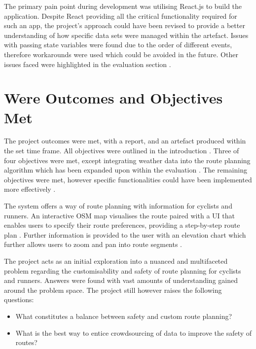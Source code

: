 The primary pain point during development was utilising React.js to build the application. Despite React providing all the critical functionality required for such an app, the project's approach could have been revised to provide a better understanding of how specific data sets were managed within the artefact. Issues with passing state variables were found due to the order of different events, therefore workarounds were used which could be avoided in the future. Other issues faced were highlighted in the evaluation section .

\label{reflection-and-conclusion:outcomes/objectives-met}
\section{Were Outcomes and Objectives Met}

The project outcomes were met, with a report, and an artefact produced within the set time frame. All objectives were outlined in the introduction . Three of four objectives were met, except integrating weather data into the route planning algorithm which has been expanded upon within the evaluation . The remaining objectives were met, however specific functionalities could have been implemented more effectively .

The system offers a way of route planning with information for cyclists and runners. An interactive OSM map visualises the route paired with a UI that enables users to specify their route preferences, providing a step-by-step route plan . Further information is provided to the user with an elevation chart which further allows users to zoom and pan into route segments .

The project acts as an initial exploration into a nuanced and multifaceted problem regarding the customisability and safety of route planning for cyclists and runners. Answers were found with vast amounts of understanding gained around the problem space. The project still however raises the following questions:
\begin{itemize}
    \item What constitutes a balance between safety and custom route planning?
    \item What is the best way to entice crowdsourcing of data to improve the safety of routes?
\end{itemize}

